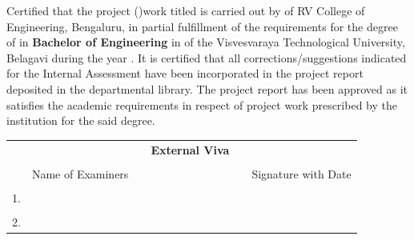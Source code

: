 \begin{spacing}{1.5}
\noindent Certified that the \fi project (\printCode)work titled \textbf{\textit{\printTitle}} is carried out by
\fi
of RV College of Engineering, Bengaluru, in partial fulfillment of the requirements for the degree of  \ifPG \textbf{\printMastersInLF} in \textbf{\printMastersPrgName} \else\textbf{Bachelor of Engineering} in \textbf{\printDepartmentLF} \fi of the Visvesvaraya Technological University, Belagavi during the year \printAcadYear. It is certified that all corrections/suggestions indicated for the Internal Assessment have been incorporated in the \fi project report deposited in the departmental library. The \fi project report has been approved as it satisfies the academic requirements in respect of \fi project work prescribed by the institution for the said degree.\\ \par
\end{spacing}

\begin{table}[H]
\centering
{}
\end{table}

\begin{table}[H]
\centering
\begin{tabular}{lccp{6cm}cc}
&&&\textbf{\Large External Viva}&&\\
&&&&&\\
&Name of Examiners &&& & Signature with Date\\
&&&&&\\
1.&&&&&\\
&&&&&\\
2.&&&&&\\
\end{tabular}%
\end{table}
